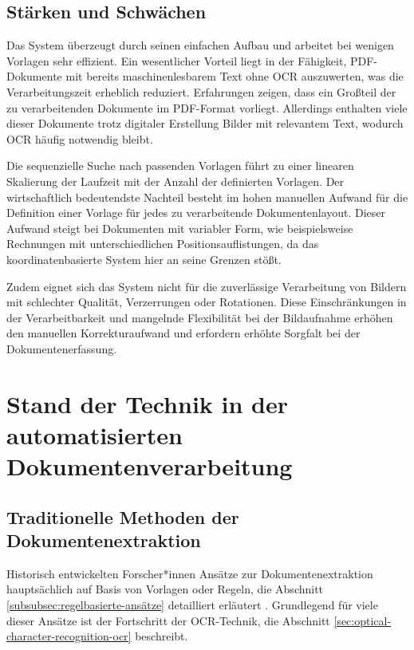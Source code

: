 \subsection{Stärken und Schwächen}
\label{subsec:stärken-und-schwächen}

Das System überzeugt durch seinen einfachen Aufbau und arbeitet bei wenigen Vorlagen sehr effizient. Ein wesentlicher Vorteil liegt in der Fähigkeit, PDF-Dokumente mit bereits maschinenlesbarem Text ohne \gls{OCR} auszuwerten, was die Verarbeitungszeit erheblich reduziert. Erfahrungen zeigen, dass ein Großteil der zu verarbeitenden Dokumente im PDF-Format vorliegt. Allerdings enthalten viele dieser Dokumente trotz digitaler Erstellung Bilder mit relevantem Text, wodurch \gls{OCR} häufig notwendig bleibt.

Die sequenzielle Suche nach passenden Vorlagen führt zu einer linearen Skalierung der Laufzeit mit der Anzahl der definierten Vorlagen. Der wirtschaftlich bedeutendste Nachteil besteht im hohen manuellen Aufwand für die Definition einer Vorlage für jedes zu verarbeitende Dokumentenlayout. Dieser Aufwand steigt bei Dokumenten mit variabler Form, wie beispielsweise Rechnungen mit unterschiedlichen Positionsauflistungen, da das koordinatenbasierte System hier an seine Grenzen stößt.

Zudem eignet sich das System nicht für die zuverlässige Verarbeitung von Bildern mit schlechter Qualität, Verzerrungen oder Rotationen. Diese Einschränkungen in der Verarbeitbarkeit und mangelnde Flexibilität bei der Bildaufnahme erhöhen den manuellen Korrekturaufwand und erfordern erhöhte Sorgfalt bei der Dokumentenerfassung.

\section{Stand der Technik in der automatisierten Dokumentenverarbeitung}
\label{sec:stand-der-technik-in-der-automatisierten-dokumentenverarbeitung}

\subsection{Traditionelle Methoden der Dokumentenextraktion}
\label{subsec:traditionelle-Methoden-der-Dokumentenverarbeitung}

Historisch entwickelten Forscher*innen Ansätze zur Dokumentenextraktion hauptsächlich auf Basis von Vorlagen oder Regeln, die Abschnitt \ref{subsubsec:regelbasierte-ansätze} detailliert erläutert \parencite{YeYibin2018Auso, ChowdhuryGobindaG.1999Tmfi}. Grundlegend für viele dieser Ansätze ist der Fortschritt der \gls{OCR}-Technik, die Abschnitt  \ref{sec:optical-character-recognition-ocr} beschreibt.

